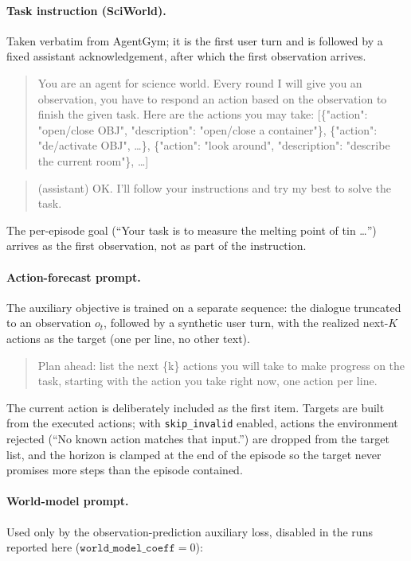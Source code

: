 \paragraph{Task instruction (SciWorld).}
Taken verbatim from AgentGym; it is the first user turn and is followed by a fixed
assistant acknowledgement, after which the first observation arrives.

\begin{quote}\small\ttfamily
You are an agent for science world. Every round I will give you an observation, you have
to respond an action based on the observation to finish the given task. Here are the
actions you may take: [\{"action": "open/close OBJ", "description": "open/close a
container"\}, \{"action": "de/activate OBJ", \ldots\}, \{"action": "look around",
"description": "describe the current room"\}, \ldots]
\end{quote}
\begin{quote}\small\ttfamily
(assistant) OK. I'll follow your instructions and try my best to solve the task.
\end{quote}

\noindent The per-episode goal (``Your task is to measure the melting point of tin
\ldots'') arrives as the first observation, not as part of the instruction.

\paragraph{Action-forecast prompt.}
The auxiliary objective is trained on a separate sequence: the dialogue truncated to an
observation $o_t$, followed by a synthetic user turn, with the realized next-$K$ actions
as the target (one per line, no other text).

\begin{quote}\small\ttfamily
Plan ahead: list the next \{k\} actions you will take to make progress on the task,
starting with the action you take right now, one action per line.
\end{quote}

\noindent The current action is deliberately included as the first item. Targets are
built from the executed actions; with \texttt{skip\_invalid} enabled, actions the
environment rejected (``No known action matches that input.'') are dropped from the
target list, and the horizon is clamped at the end of the episode so the target never
promises more steps than the episode contained.

\paragraph{World-model prompt.}
Used only by the observation-prediction auxiliary loss, disabled in the runs reported
here ($\texttt{world\_model\_coeff} = 0$):

